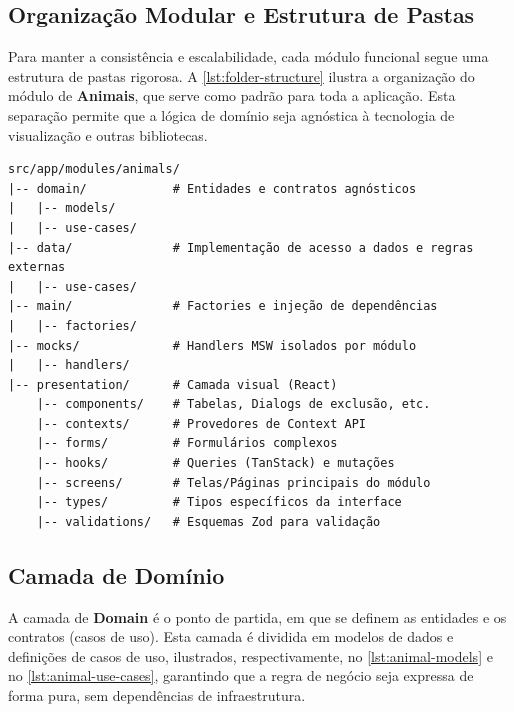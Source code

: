\subsection{Organização Modular e Estrutura de Pastas}\label{subsec:estruturaPastas}

Para manter a consistência e escalabilidade, cada módulo funcional segue uma estrutura de pastas rigorosa. A \autoref{lst:folder-structure} ilustra a organização do módulo de \textbf{Animais}, que serve como padrão para toda a aplicação. Esta separação permite que a lógica de domínio seja agnóstica à tecnologia de visualização e outras bibliotecas.

\begin{center}
\end{center}
\vspace{-1.5\baselineskip}
\begin{lstlisting}[]
src/app/modules/animals/
|-- domain/            # Entidades e contratos agnósticos
|   |-- models/
|   |-- use-cases/
|-- data/              # Implementação de acesso a dados e regras externas
|   |-- use-cases/
|-- main/              # Factories e injeção de dependências
|   |-- factories/
|-- mocks/             # Handlers MSW isolados por módulo
|   |-- handlers/
|-- presentation/      # Camada visual (React)
    |-- components/    # Tabelas, Dialogs de exclusão, etc.
    |-- contexts/      # Provedores de Context API
    |-- forms/         # Formulários complexos
    |-- hooks/         # Queries (TanStack) e mutações
    |-- screens/       # Telas/Páginas principais do módulo
    |-- types/         # Tipos específicos da interface
    |-- validations/   # Esquemas Zod para validação
\end{lstlisting}
\vspace{-0.5\baselineskip}
\begin{center}
\begingroup{}\fonte{}\endgroup
\end{center}

\subsection{Camada de Domínio}\label{subsec:camadaDominio}

A camada de \textbf{Domain} é o ponto de partida, em que se definem as entidades e os contratos (casos de uso). Esta camada é dividida em modelos de dados e definições de casos de uso, ilustrados, respectivamente, no \autoref{lst:animal-models} e no \autoref{lst:animal-use-cases}, garantindo que a regra de negócio seja expressa de forma pura, sem dependências de infraestrutura.

